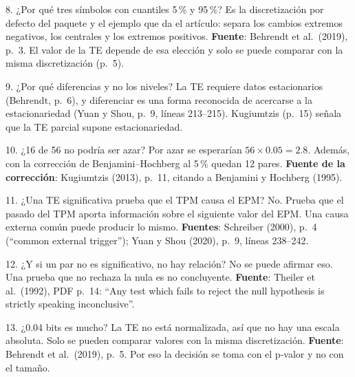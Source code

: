 \documentclass[11pt,openany]{book}
\begin{document}
\begin{respuesta}{8. ¿Por qué tres símbolos con cuantiles 5\,\% y 95\,\%?}
Es la discretización por defecto del paquete y el ejemplo que da el artículo: separa los cambios extremos negativos, los centrales y los extremos positivos. \textbf{Fuente}: Behrendt et al.\ (2019), p.~3. El valor de la TE depende de esa elección y solo se puede comparar con la misma discretización (p.~5).
\end{respuesta}

\begin{respuesta}{9. ¿Por qué diferencias y no los niveles?}
La TE requiere datos estacionarios (Behrendt, p.~6), y diferenciar es una forma reconocida de acercarse a la estacionariedad (Yuan y Shou, p.~9, líneas 213--215). Kugiumtzis (p.~15) señala que la TE parcial supone estacionariedad.
\end{respuesta}

\begin{respuesta}{10. ¿16 de 56 no podría ser azar?}
Por azar se esperarían $56 \times 0.05 = 2.8$. Además, con la corrección de Benjamini--Hochberg al 5\,\% quedan 12 pares. \textbf{Fuente de la corrección}: Kugiumtzis (2013), p.~11, citando a Benjamini y Hochberg (1995).
\end{respuesta}

\begin{respuesta}{11. ¿Una TE significativa prueba que el TPM causa el EPM?}
No. Prueba que el pasado del TPM aporta información sobre el siguiente valor del EPM. Una causa externa común puede producir lo mismo. \textbf{Fuentes}: Schreiber (2000), p.~4 (``common external trigger''); Yuan y Shou (2020), p.~9, líneas 238--242.
\end{respuesta}

\begin{respuesta}{12. ¿Y si un par no es significativo, no hay relación?}
No se puede afirmar eso. Una prueba que no rechaza la nula es no concluyente. \textbf{Fuente}: Theiler et al.\ (1992), PDF p.~14: ``Any test which fails to reject the null hypothesis is strictly speaking inconclusive''.
\end{respuesta}

\begin{respuesta}{13. ¿0.04 bits es mucho?}
La TE no está normalizada, así que no hay una escala absoluta. Solo se pueden comparar valores con la misma discretización. \textbf{Fuente}: Behrendt et al.\ (2019), p.~5. Por eso la decisión se toma con el p-valor y no con el tamaño.
\end{respuesta}
\end{document}
